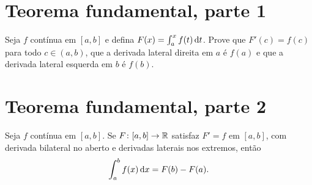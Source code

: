 \documentclass[11pt,a4paper]{article}
\begin{document}
\section{Teorema fundamental, parte 1}

Seja $f$ contínua em $[a,b]$ e defina $F(x)=\int_a^x f(t)\,\mathrm{d} t$. Prove que $F'(c)=f(c)$ para todo $c\in(a,b)$, que a derivada lateral direita em $a$ é $f(a)$ e que a derivada lateral esquerda em $b$ é $f(b)$.

\vspace{6.5cm}

\section{Teorema fundamental, parte 2}

Seja $f$ contínua em $[a,b]$. Se $F\colon[a,b]\to\mathbb{R}$ satisfaz $F'=f$ em $[a,b]$, com derivada bilateral no aberto e derivadas laterais nos extremos, então
\[
\int_a^b f(x)\,\mathrm{d} x=F(b)-F(a).
\]

\vspace{6.5cm}
\end{document}
